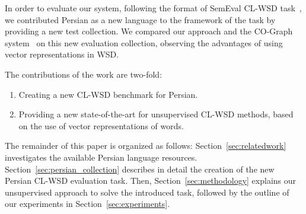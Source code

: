 In order to evaluate our system, following the format of SemEval CL-WSD task~\cite{lefever2013semeval}, %
we contributed Persian as a new language to the framework of the task by providing a new test collection. We compared our approach and the CO-Graph system~\cite{duqueco} on this new evaluation collection, observing the advantages of using vector representations in WSD.

The contributions of the work are two-fold:
\vspace{-0.2cm}
\begin{enumerate}
\item Creating a new CL-WSD benchmark for Persian.
\vspace{-0.2cm}
\item Providing a new state-of-the-art for unsupervised CL-WSD methods, based on the use of vector representations of words.
\end{enumerate}
\vspace{-0.2cm}

The remainder of this paper is organized as follows: Section~\ref{sec:relatedwork} investigates the available Persian language resources. Section~\ref{sec:persian_collection} describes in detail the creation of the new Persian CL-WSD evaluation task. Then, Section~\ref{sec:methodology} explains our unsupervised approach to solve the introduced task, followed by the outline of our experiments in Section~\ref{sec:experiments}. %

